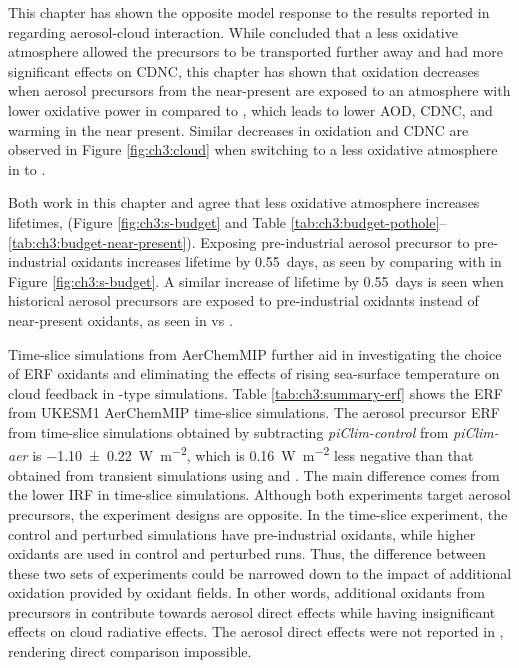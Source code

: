 This chapter has shown the opposite model response to the results reported in \citet{karsetStrongImpactsAerosol2018} regarding aerosol-cloud interaction. While \citet{karsetStrongImpactsAerosol2018} concluded that a less oxidative atmosphere allowed the precursors to be transported further away and had more significant effects on CDNC, this chapter has shown that oxidation decreases when aerosol precursors from the near-present are exposed to an atmosphere with lower oxidative power in \sstpio{} compared to \histsst{}, which leads to lower AOD, CDNC, and warming in the near present. Similar decreases in oxidation and CDNC are observed in Figure \ref{fig:ch3:cloud} when switching to a less oxidative atmosphere in \sstpiaer{} to \sstpintcf{}. 

Both work in this chapter and \citet{karsetStrongImpactsAerosol2018} agree that less oxidative atmosphere increases  lifetimes, (Figure \ref{fig:ch3:s-budget} and Table \ref{tab:ch3:budget-pothole}--\ref{tab:ch3:budget-near-present}). Exposing pre-industrial aerosol precursor to pre-industrial oxidants increases  lifetime by \qty{0.55}{days}, as seen by comparing \sstpintcf{} with \sstpiaer{} in Figure \ref{fig:ch3:s-budget}. A similar increase of  lifetime by \qty{0.55}{days} is seen when historical aerosol precursors are exposed to pre-industrial oxidants instead of near-present oxidants, as seen in \sstpio{} vs \histsst{}. 

Time-slice simulations from AerChemMIP further aid in investigating the choice of ERF oxidants and eliminating the effects of rising sea-surface temperature on cloud feedback in \histsst{}-type simulations. Table \ref{tab:ch3:summary-erf} shows the ERF from UKESM1 AerChemMIP time-slice simulations. The aerosol precursor ERF from time-slice simulations obtained by subtracting \textit{piClim-control} from \textit{piClim-aer} is \qty{-1.10+-0.22}{\watt\per\metre\squared}, which is \qty{0.16}{\watt\per\metre\squared} less negative than that obtained from transient simulations using \histsst{} and \sstpiaer{}. The main difference comes from the lower IRF in time-slice simulations. Although both experiments target aerosol precursors, the experiment designs are opposite. In the time-slice experiment, the control and perturbed simulations have pre-industrial oxidants, while higher oxidants are used in control and perturbed runs. Thus, the difference between these two sets of experiments could be narrowed down to the impact of additional oxidation provided by oxidant fields. In other words, additional oxidants from  precursors in \histsst{} contribute towards aerosol direct effects while having insignificant effects on cloud radiative effects. The aerosol direct effects were not reported in \citet{karsetStrongImpactsAerosol2018}, rendering direct comparison impossible.


